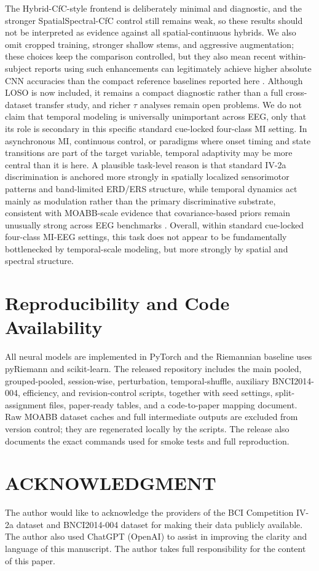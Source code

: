 \documentclass[journal]{IEEEtran}
\begin{document}
The Hybrid-CfC-style frontend is deliberately minimal and diagnostic, and the stronger SpatialSpectral-CfC control still remains weak, so these results should not be interpreted as evidence against all spatial-continuous hybrids. We also omit cropped training, stronger shallow stems, and aggressive augmentation; these choices keep the comparison controlled, but they also mean recent within-subject reports using such enhancements can legitimately achieve higher absolute CNN accuracies than the compact reference baselines reported here \cite{ingolfsson2020eegtcnet,elouahidi2024simpleconv,li2024ctnet,han2024eegcct}. Although LOSO is now included, it remains a compact diagnostic rather than a full cross-dataset transfer study, and richer $\tau$ analyses remain open problems. We do not claim that temporal modeling is universally unimportant across EEG, only that its role is secondary in this specific standard cue-locked four-class MI setting. In asynchronous MI, continuous control, or paradigms where onset timing and state transitions are part of the target variable, temporal adaptivity may be more central than it is here. A plausible task-level reason is that standard IV-2a discrimination is anchored more strongly in spatially localized sensorimotor patterns and band-limited ERD/ERS structure, while temporal dynamics act mainly as modulation rather than the primary discriminative substrate, consistent with MOABB-scale evidence that covariance-based priors remain unusually strong across EEG benchmarks \cite{agarwalla2024moabb}. Overall, within standard cue-locked four-class MI-EEG settings, this task does not appear to be fundamentally bottlenecked by temporal-scale modeling, but more strongly by spatial and spectral structure.

\section*{Reproducibility and Code Availability}

All neural models are implemented in PyTorch and the Riemannian baseline uses pyRiemann and scikit-learn. The released repository includes the main pooled, grouped-pooled, session-wise, perturbation, temporal-shuffle, auxiliary BNCI2014-004, efficiency, and revision-control scripts, together with seed settings, split-assignment files, paper-ready tables, and a code-to-paper mapping document. Raw MOABB dataset caches and full intermediate outputs are excluded from version control; they are regenerated locally by the scripts. The release also documents the exact commands used for smoke tests and full reproduction.

\section*{ACKNOWLEDGMENT}
The author would like to acknowledge the providers of the BCI Competition IV-2a dataset and BNCI2014-004 dataset for making their data publicly available. The author also used ChatGPT (OpenAI) to assist in improving the clarity and language of this manuscript. The author takes full responsibility for the content of this paper.



\end{document}
